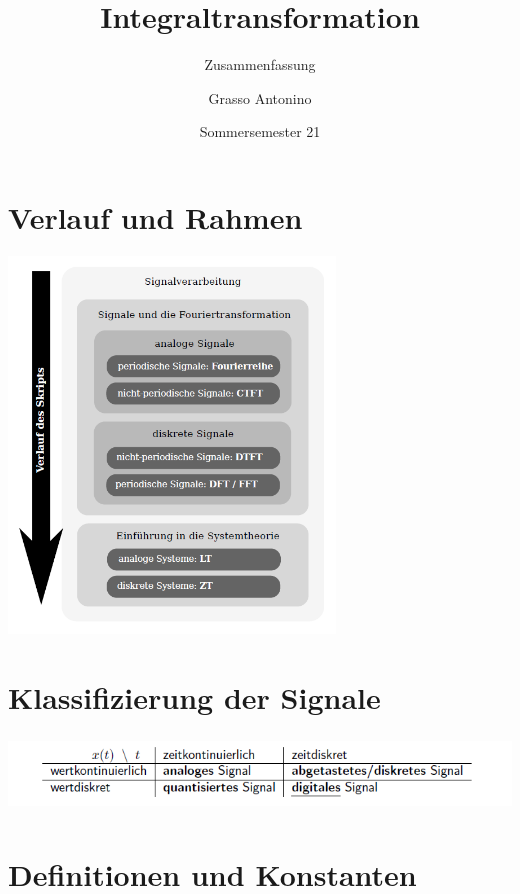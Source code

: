 \documentclass[12pt,a4paper]{scrartcl}
\title{Integraltransformation}
\subtitle{Zusammenfassung}
\author{Grasso Antonino}
\date{Sommersemester 21}
\begin{document}
\begin{titlepage}
\maketitle
\vspace{100px}

\end{titlepage}

\tableofcontents
\newpage


\section{Verlauf und Rahmen}
\label{sec:verlauf-und-rahmen}
\includegraphics[height=10cm]{Pictures/Verlauf.png}

\section{Klassifizierung der Signale}
\label{sec:klassifizierung}
\includegraphics[height=2cm]{Pictures/Einheiten.png}

\section{Definitionen und Konstanten}
\label{sec:definitionen-und-konstanten}
\end{document}
